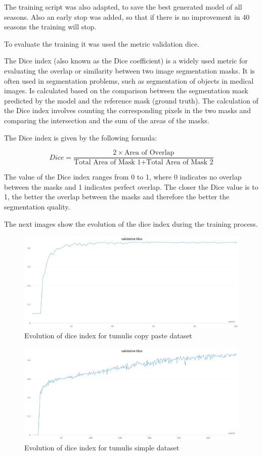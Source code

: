 The training script was also adapted, to save the best generated model of all seasons. Also an early stop was added, so that if there is no improvement in 40 seasons the training will stop.

To evaluate the training it was used the metric validation dice.

The Dice index (also known as the Dice coefficient) is a widely used metric for evaluating the overlap or similarity between two image segmentation masks. It is often used in segmentation problems, such as segmentation of objects in medical images. Is calculated based on the comparison between the segmentation mask predicted by the model and the reference mask (ground truth). The calculation of the Dice index involves counting the corresponding pixels in the two masks and comparing the intersection and the sum of the areas of the masks.

The Dice index is given by the following formula:

\begin{equation}
    Dice = \frac{2 \times \text{Area of Overlap}}{\text{Total Area of Mask 1} + \text{Total Area of Mask 2}}
\end{equation}

The value of the Dice index ranges from 0 to 1, where 0 indicates no overlap between the masks and 1 indicates perfect overlap. The closer the Dice value is to 1, the better the overlap between the masks and therefore the better the segmentation quality.

The next images show the evolution of the dice index during the training process.

\begin{figure}[H]
\centering
\includegraphics[width=12cm]{images/unet/mamoas_copy.png}
\caption{Evolution of dice index for tumulis copy paste dataset}
\end{figure}

\begin{figure}[H]
\centering
\includegraphics[width=12cm]{images/unet/mamoas_simple.png}
\caption{Evolution of dice index for tumulis simple dataset}
\end{figure}

